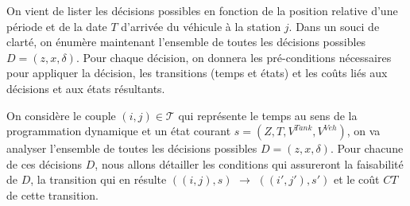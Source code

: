 On vient de lister les décisions possibles en fonction de la position relative d'une période et de la date $T$ d'arrivée du véhicule à la station $j$. Dans un souci de clarté, on énumère maintenant l'ensemble de toutes les décisions possibles $D=(z,x,\delta)$. Pour chaque décision, on donnera les pré-conditions nécessaires pour appliquer la décision, les transitions (temps et états) et les coûts liés aux décisions et aux états résultants.


On considère le couple $(i, j) \in \mathcal{T}$ qui représente le temps au sens de la programmation dynamique et un état courant $s = (Z, T, V^{Tank}, V^{Veh})$, on va analyser l'ensemble de toutes les décisions possibles $D = (z, x, \delta)$. Pour chacune de ces décisions $D$, nous allons détailler les conditions qui assureront la faisabilité de $D$, la transition qui en résulte $((i, j), s)$ $\rightarrow$ $((i', j'), s')$ et le coût $CT$ de cette transition.

